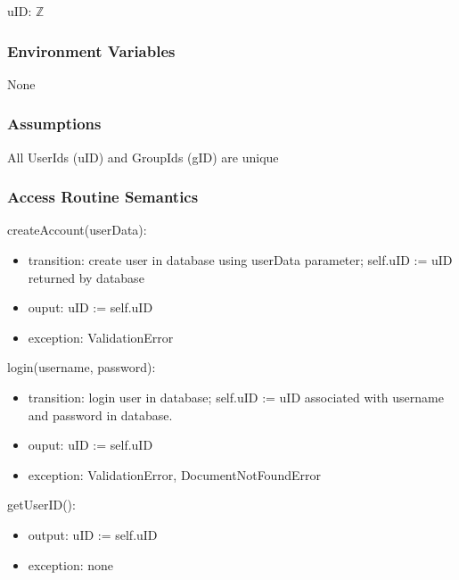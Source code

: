 \documentclass[12pt, titlepage]{article}
\begin{document}
uID: $\mathbb{Z}$


\subsubsection{Environment Variables}

None


\subsubsection{Assumptions}

All UserIds (uID) and GroupIds (gID) are unique


\subsubsection{Access Routine Semantics}

\noindent createAccount(userData):
\begin{itemize}
\item transition: create user in database using userData parameter; self.uID := uID returned by database
\item ouput: uID := self.uID
\item exception: ValidationError
\end{itemize}

\noindent login(username, password):
\begin{itemize}
\item transition: login user in database; self.uID := uID associated with username and password in database.
\item ouput: uID := self.uID
\item exception: ValidationError, DocumentNotFoundError
\end{itemize}

\noindent getUserID():
\begin{itemize}
\item output: uID := self.uID
\item exception: none
\end{itemize}
\end{document}
